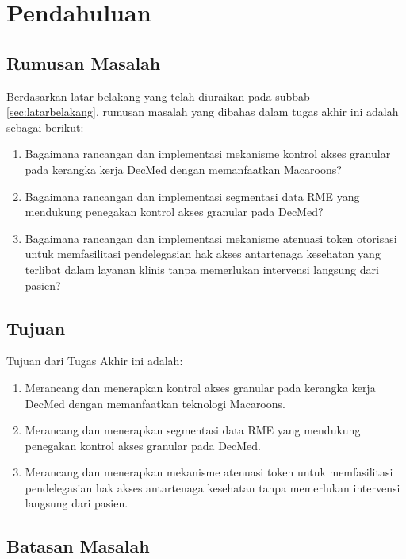 \chapter{Pendahuluan}
\label{chap:pendahuluan}



\section{Rumusan Masalah}
\label{sec:rumusan-masalah}

Berdasarkan latar belakang yang telah diuraikan pada subbab \ref{sec:latarbelakang}, rumusan masalah yang dibahas dalam tugas akhir ini adalah sebagai berikut:

\begin{enumerate}
	\item Bagaimana rancangan dan implementasi mekanisme kontrol akses granular pada kerangka kerja DecMed dengan memanfaatkan Macaroons?
	\item Bagaimana rancangan dan implementasi segmentasi data RME yang mendukung penegakan kontrol akses granular pada DecMed?
	\item Bagaimana rancangan dan implementasi mekanisme atenuasi token otorisasi untuk memfasilitasi pendelegasian hak akses antartenaga kesehatan yang terlibat dalam layanan klinis tanpa memerlukan intervensi langsung dari pasien?
\end{enumerate}

\section{Tujuan}

Tujuan dari Tugas Akhir ini adalah:
\begin{enumerate}
	\item Merancang dan menerapkan kontrol akses granular pada kerangka kerja DecMed dengan memanfaatkan teknologi Macaroons.
	\item Merancang dan menerapkan segmentasi data RME yang mendukung penegakan kontrol akses granular pada DecMed.
	\item Merancang dan menerapkan mekanisme atenuasi token untuk memfasilitasi pendelegasian hak akses antartenaga kesehatan tanpa memerlukan intervensi langsung dari pasien.
\end{enumerate}

\section{Batasan Masalah}

